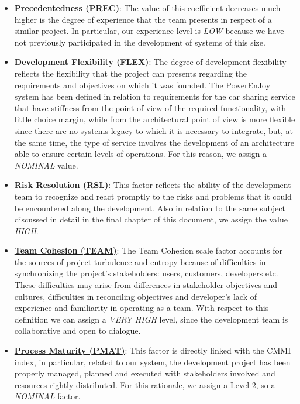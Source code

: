 \documentclass[10pt, a4paper,titlepage]{article}
\begin{document}
\begin{itemize}
\item \underline{\textbf{Precedentedness (PREC)}}:  The value of this coefficient decreases much higher is the degree of experience that the team presents in respect of a similar project. In particular, our experience level is \emph{LOW} because we have not previously participated in the development of systems of this size.
\item \underline{\textbf{Development Flexibility (FLEX)}}: The degree of development flexibility reflects the flexibility that the project can presents regarding the requirements and objectives on which it was founded. The PowerEnJoy system has been defined in relation to requirements for the car sharing service that have stiffness from the point of view of the required functionality, with little choice margin, while from the architectural point of view is more flexible since there are no systems legacy to which it is necessary to integrate, but, at the same time, the type of service involves the development of an architecture able to ensure certain levels of operations. For this reason, we assign a \emph{NOMINAL} value.
\item \underline{\textbf{Risk Resolution (RSL)}}: This factor reflects the ability of the development team to recognize and react promptly to the risks and problems that it could be encountered along the development. Also in relation to the same subject discussed in detail in the final chapter of this document, we assign the value \emph{HIGH}.
\item \underline{\textbf{Team Cohesion (TEAM)}}: The Team Cohesion scale factor accounts for the sources of project turbulence and entropy because of difficulties in synchronizing the project’s stakeholders: users, customers, developers etc. These difficulties may arise from differences in stakeholder objectives and cultures, difficulties in reconciling objectives and developer’s lack of experience and familiarity in operating as a team. With respect to this definition we can assign a \emph{VERY HIGH} level, since the development team is collaborative and open to dialogue.
\item \underline{\textbf{Process Maturity (PMAT)}}: This factor is directly linked with the CMMI index, in particular, related to our system, the development project has been properly managed, planned and executed with stakeholders involved and resources rightly distributed. For this rationale, we assign a Level 2, so a \emph{NOMINAL} factor. 
\end{itemize}
\end{document}

